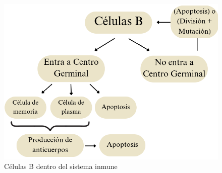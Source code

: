 \begin{figure}[H] %
    \centering
    \includegraphics[width=1\textwidth]{Graphics/is.png}
    \caption{Células B dentro del sistema inmune}
    \label{fig:is}
\end{figure}






